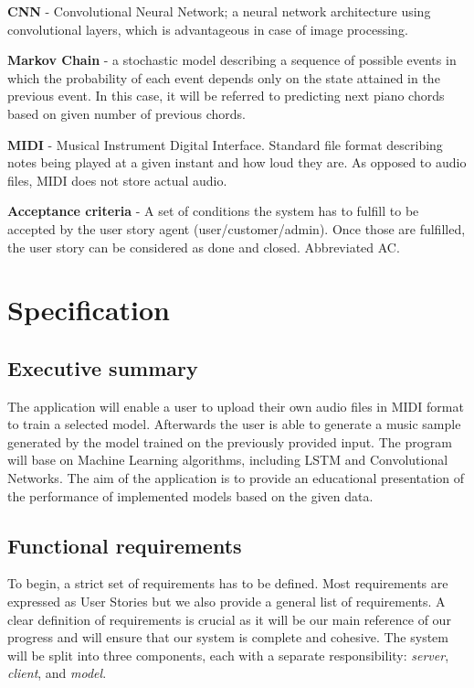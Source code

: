 \documentclass{article}
\begin{document}
\vskip5pt \noindent
\textbf{CNN} - Convolutional Neural Network; a neural network architecture using convolutional layers, which is advantageous in case of image processing. \cite{CNN}

\vskip5pt \noindent
\textbf{Markov Chain} - a stochastic model describing a sequence of possible events in which the probability of each event depends only on the state attained in the previous event. In this case, it will be referred to predicting next piano chords based on given number of previous chords. \cite{Markov}

\vskip5pt \noindent
\textbf{MIDI} - Musical Instrument Digital Interface. Standard file format describing notes being played at a given instant and how loud they are. As opposed to audio files, MIDI does not store actual audio.


\vskip5pt \noindent
\textbf{Acceptance criteria} - A set of conditions the system has to fulfill to be accepted by the user story agent (user/customer/admin). Once those are fulfilled, the user story can be considered as done and closed. Abbreviated AC.


\section{Specification}

\subsection{Executive summary}

The application will enable a user to upload their own audio files in MIDI format to train a selected model. Afterwards the user is able to generate a music sample generated by the model trained on the previously provided input. The program will base on Machine Learning algorithms, including LSTM and Convolutional Networks. The aim of the application is to provide an educational presentation of the performance of implemented models based on the given data.

\subsection{Functional requirements}

To begin, a strict set of requirements has to be defined. Most requirements are expressed as User Stories but we also provide a general list of requirements. A clear definition of requirements is crucial as it will be our main reference of our progress and will ensure that our system is complete and cohesive. The system will be split into three components, each with a separate responsibility: \textit{server}, \textit{client}, and \textit{model}.
\end{document}
